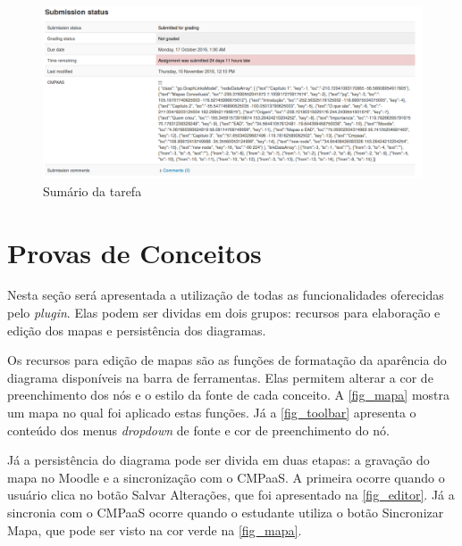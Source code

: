 \documentclass[
	12pt,				%
	openright,			%
	oneside,			%
	a4paper,			%
	english,			%
	french,				%
	spanish,			%
	brazil				%
	]{abntex2}
\begin{document}
\begin{figure}[htb]
	\caption{\label{fig_sumario} Sumário da tarefa}
	\begin{center}
		\includegraphics[scale=0.3]{sumario.png}
	\end{center}
\end{figure}

\section{Provas de Conceitos}

Nesta seção será apresentada a utilização de todas as funcionalidades oferecidas pelo \textit{plugin}. Elas podem ser dividas em dois grupos: recursos para elaboração e edição dos mapas e persistência dos diagramas.

Os recursos para edição de mapas são as funções de formatação da aparência do diagrama disponíveis na barra de ferramentas. Elas permitem alterar a cor de preenchimento dos nós e o estilo da fonte de cada conceito. A \autoref{fig_mapa} mostra um mapa no qual foi aplicado estas funções. Já a \autoref{fig_toolbar} apresenta o conteúdo dos menus \textit{dropdown} de fonte e cor de preenchimento do nó.

Já a persistência do diagrama pode ser divida em duas etapas: a gravação do mapa no Moodle e a sincronização com o CMPaaS. A primeira ocorre quando o usuário clica no botão Salvar Alterações, que foi apresentado na \autoref{fig_editor}. Já a sincronia com o CMPaaS ocorre quando o estudante utiliza o botão Sincronizar Mapa, que pode ser visto na cor verde na \autoref{fig_mapa}.
\end{document}
